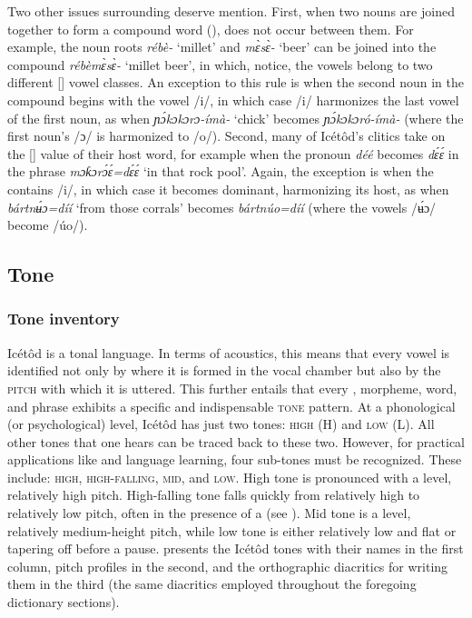 Two other issues surrounding  deserve mention. First, when two nouns are joined together to form a compound word (),  does not occur between them. For example, the noun roots \textit{rébè-} ‘millet’ and \textit{m\`{ɛ}s\`{ɛ}-} ‘beer’ can be joined into the compound \textit{rébèm\`{ɛ}s\`{ɛ}-} ‘millet beer’, in which, notice, the vowels belong to two different [] vowel classes. An exception to this rule is when the second noun in the compound begins with the vowel /i/, in which case /i/ harmonizes the last vowel of the first noun, as when \textit{ɲ\'{ɔ}kɔkɔrɔ-ímà-} ‘chick’ becomes \textit{ɲ\'{ɔ}kɔkɔró-ímà-} (where the first noun’s /ɔ/ is harmonized to /o/). Second, many of Icétôd’s clitics take on the [] value of their host word, for example when the  pronoun \textit{déé} becomes \textit{d\'{ɛ}\'{ɛ}} in the phrase \textit{mɔƙɔr\'{ɔ}\'{ɛ}=d\'{ɛ}\'{ɛ}} ‘in that rock pool’. Again, the exception is when the  contains /i/, in which case it becomes dominant, harmonizing its host, as when \textit{bár{\Í}t{\Í}n\'{ʉ}ɔ=díí} ‘from those corrals’ becomes \textit{bár{\Í}t{\Í}núo=díí} (where the vowels /\'{ʉ}ɔ/ become /úo/).
 
\subsection{Tone}\label{sec:2.6}
\subsubsection{Tone inventory}\label{sec:2.6.1}

Icétôd is a tonal language. In terms of acoustics, this means that every vowel is identified not only by where it is formed in the vocal chamber but also by the \textsc{pitch} with which it is uttered. This further entails that every , morpheme, word, and phrase exhibits a specific and indispensable \textsc{tone} pattern. At a phonological (or psychological) level, Icétôd has just two tones: \textsc{high} (H) and \textsc{low (L)}. All other tones that one hears can be traced back to these two. However, for practical applications like  and language learning, four sub-tones must be recognized. These include: \textsc{high}, \textsc{high-falling}, \textsc{mid}, and \textsc{low}. High tone is pronounced with a level, relatively high pitch. High-falling tone falls quickly from relatively high to relatively low pitch, often in the presence of a  (see ). Mid tone is a level, relatively medium-height pitch, while low tone is either relatively low and flat or tapering off before a pause.  presents the Icétôd tones with their names in the first column, pitch profiles in the second, and the orthographic diacritics for writing them in the third (the same diacritics employed throughout the foregoing dictionary sections).


